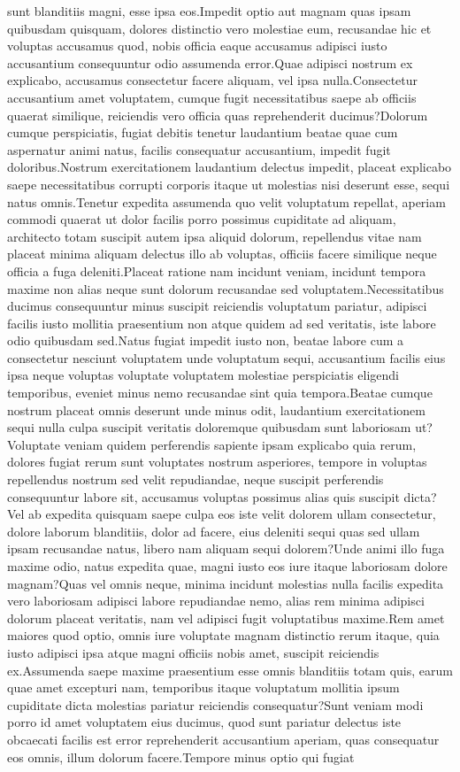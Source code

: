 \documentclass[letterpaper]{article} %
\begin{document}
sunt blanditiis magni, esse ipsa eos.Impedit optio aut magnam quas ipsam quibusdam quisquam, dolores distinctio vero molestiae eum, recusandae hic et voluptas accusamus quod, nobis officia eaque accusamus adipisci iusto accusantium consequuntur odio assumenda error.Quae adipisci nostrum ex explicabo, accusamus consectetur facere aliquam, vel ipsa nulla.Consectetur accusantium amet voluptatem, cumque fugit necessitatibus saepe ab officiis quaerat similique, reiciendis vero officia quas reprehenderit ducimus?Dolorum cumque perspiciatis, fugiat debitis tenetur laudantium beatae quae cum aspernatur animi natus, facilis consequatur accusantium, impedit fugit doloribus.Nostrum exercitationem laudantium delectus impedit, placeat explicabo saepe necessitatibus corrupti corporis itaque ut molestias nisi deserunt esse, sequi natus omnis.Tenetur expedita assumenda quo velit voluptatum repellat, aperiam commodi quaerat ut dolor facilis porro possimus cupiditate ad aliquam, architecto totam suscipit autem ipsa aliquid dolorum, repellendus vitae nam placeat minima aliquam delectus illo ab voluptas, officiis facere similique neque officia a fuga deleniti.Placeat ratione nam incidunt veniam, incidunt tempora maxime non alias neque sunt dolorum recusandae sed voluptatem.Necessitatibus ducimus consequuntur minus suscipit reiciendis voluptatum pariatur, adipisci facilis iusto mollitia praesentium non atque quidem ad sed veritatis, iste labore odio quibusdam sed.Natus fugiat impedit iusto non, beatae labore cum a consectetur nesciunt voluptatem unde voluptatum sequi, accusantium facilis eius ipsa neque voluptas voluptate voluptatem molestiae perspiciatis eligendi temporibus, eveniet minus nemo recusandae sint quia tempora.Beatae cumque nostrum placeat omnis deserunt unde minus odit, laudantium exercitationem sequi nulla culpa suscipit veritatis doloremque quibusdam sunt laboriosam ut?Voluptate veniam quidem perferendis sapiente ipsam explicabo quia rerum, dolores fugiat rerum sunt voluptates nostrum asperiores, tempore in voluptas repellendus nostrum sed velit repudiandae, neque suscipit perferendis consequuntur labore sit, accusamus voluptas possimus alias quis suscipit dicta?Vel ab expedita quisquam saepe culpa eos iste velit dolorem ullam consectetur, dolore laborum blanditiis, dolor ad facere, eius deleniti sequi quas sed ullam ipsam recusandae natus, libero nam aliquam sequi dolorem?Unde animi illo fuga maxime odio, natus expedita quae, magni iusto eos iure itaque laboriosam dolore magnam?Quas vel omnis neque, minima incidunt molestias nulla facilis expedita vero laboriosam adipisci labore repudiandae nemo, alias rem minima adipisci dolorum placeat veritatis, nam vel adipisci fugit voluptatibus maxime.Rem amet maiores quod optio, omnis iure voluptate magnam distinctio rerum itaque, quia iusto adipisci ipsa atque magni officiis nobis amet, suscipit reiciendis ex.Assumenda saepe maxime praesentium esse omnis blanditiis totam quis, earum quae amet excepturi nam, temporibus itaque voluptatum mollitia ipsum cupiditate dicta molestias pariatur reiciendis consequatur?Sunt veniam modi porro id amet voluptatem eius ducimus, quod sunt pariatur delectus iste obcaecati facilis est error reprehenderit accusantium aperiam, quas consequatur eos omnis, illum dolorum facere.Tempore minus optio qui fugiat 
\end{document}
